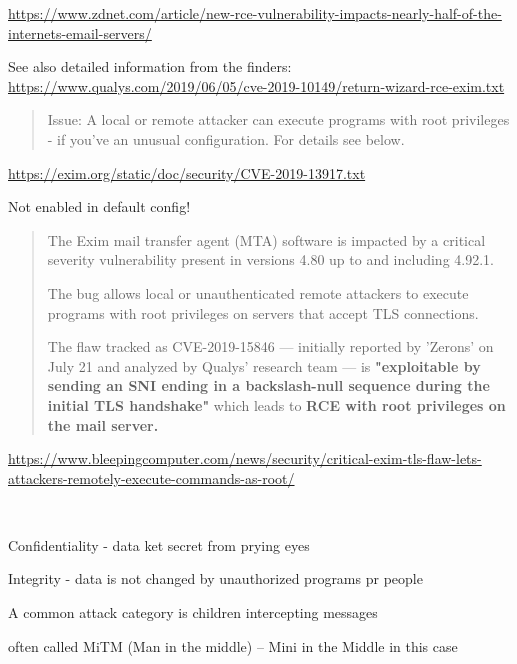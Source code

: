 \documentclass[Screen16to9,17pt]{foils}
\begin{document}
{\footnotesize\url{https://www.zdnet.com/article/new-rce-vulnerability-impacts-nearly-half-of-the-internets-email-servers/}}

See also detailed information from the finders:\\ \url{https://www.qualys.com/2019/06/05/cve-2019-10149/return-wizard-rce-exim.txt}



\begin{quote}
Issue:      A local or remote attacker can execute programs with root
            privileges - if you've an unusual configuration. For details
	    see below.
\end{quote}

\url{https://exim.org/static/doc/security/CVE-2019-13917.txt}

Not enabled in default config!


\begin{quote}
The Exim mail transfer agent (MTA) software is impacted by a critical severity vulnerability present in versions 4.80 up to and including 4.92.1.

The bug allows local or unauthenticated remote attackers to execute programs with root privileges on servers that accept TLS connections.

The flaw tracked as CVE-2019-15846 — initially reported by 'Zerons' on July 21 and analyzed by Qualys' research team — is \textbf{"exploitable by sending an SNI ending in a backslash-null sequence during the initial TLS handshake"} which leads to \textbf{RCE with root privileges on the mail server.}
\end{quote}

\url{https://www.bleepingcomputer.com/news/security/critical-exim-tls-flaw-lets-attackers-remotely-execute-commands-as-root/}




{~}

\begin{list2}
\item Confidentiality - data ket secret from prying eyes
\item Integrity - data is not changed by unauthorized programs pr people
\item A common attack category is children intercepting messages
\item often called MiTM (Man in the middle) -- Mini in the Middle in this case
\end{list2}
\end{document}
